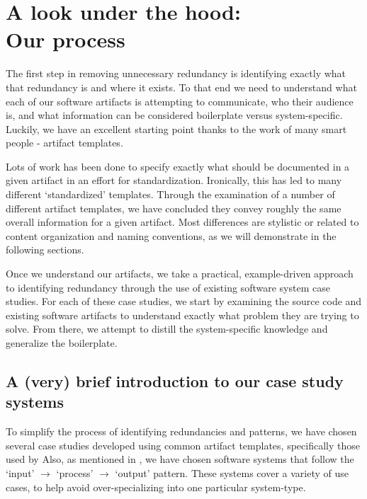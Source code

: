 \chapter{A look under the hood: \\ Our process}

The first step in removing unnecessary redundancy is identifying exactly what
that redundancy is and where it exists. To that end we need to understand what
each of our software artifacts is attempting to communicate, who their audience
is, and what information can be considered boilerplate versus system-specific.
Luckily, we have an excellent starting point thanks to the work of many smart
people - artifact templates.

Lots of work  has been done to specify 
exactly what should be documented in a given artifact in an effort for 
standardization. Ironically, this has led to many different `standardized' 
templates. Through the examination of a number of different artifact templates, 
we have concluded they convey roughly the same overall information for a given 
artifact. Most differences are stylistic or related to content 
organization and naming conventions, as we will demonstrate in the following 
sections.

Once we understand our artifacts, we take a practical, example-driven approach
to identifying redundancy through the use of existing software system case
studies. For each of these case studies, we start by examining the source code
and existing software artifacts to understand exactly what problem they are
trying to solve. From there, we attempt to distill the system-specific knowledge
and generalize the boilerplate.

\section{A (very) brief introduction to our case study systems}
 
%    

To simplify the process of identifying redundancies and patterns, we have chosen
several case studies developed using common artifact templates, specifically 
those used by \smithea{}  Also, as mentioned in 
\ds{[SCOPE]}, we have chosen software systems that follow the `input' 
$\rightarrow$ `process' $\rightarrow$ `output' pattern. These systems cover a 
variety of use cases, to help avoid over-specializing into one particular 
system-type. 

